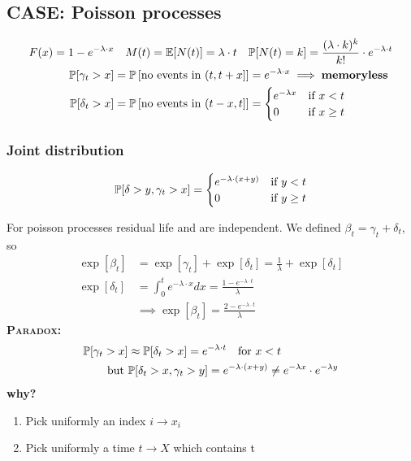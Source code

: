 \subsection{CASE: Poisson processes}
\begin{equation}
  \begin{split}
    F(x)=1-e^{-\lambda \cdot x} &\quad M(t)=\mathbb{E}[N(t)]=\lambda \cdot t \quad \mathbb{P}[N(t)=k]=\frac{(\lambda \cdot k)^k}{k!}\cdot e^{-\lambda \cdot t}\\
    \mathbb{P}[\gamma_t > x]&=\mathbb{P}\left[\text{no events in } (t,t+x] \right]=e^{-\lambda \cdot x} \implies \text{\textbf{memoryless}}\\
    \mathbb{P}[\delta_t > x] &= \mathbb{P} \left[\text{no events in }(t-x,t] \right]=
    \begin{cases}
      e^{-\lambda x} & \text{if } x < t \\
      0 & \text{if } x \ge t\\
    \end{cases}
  \end{split}
\end{equation}

\subsubsection{Joint distribution}
\begin{equation}
  \mathbb{P}[\delta > y , \gamma_t > x] =
  \begin{cases}
    e^{-\lambda \cdot (x+y)} & \text{if } y < t \\
    0     & \text{if } y \ge t \\
  \end{cases}
\end{equation}

For poisson processes residual life and are independent. We defined $\beta_t=\gamma_t + \delta_t$, so
\begin{equation}\begin{split}
\exp[\beta_t]&=\exp[\gamma_t] + \exp[\delta_t]  = \frac{1}{\lambda} + \exp[\delta_t]\\
\exp[\delta_t]&= \int_0^t e^{-\lambda \cdot x} dx = \frac{1-e^{-\lambda \cdot t}}{\lambda} \\
&\implies \exp[\beta_t]= \frac{2-e^{-\lambda \cdot t}}{\lambda}
\end{split}\end{equation}
\textbf{\textsc{Paradox:}}
\begin{equation}
  \begin{split}
    \mathbb{P}[\gamma_t > x] &\approx \mathbb{P}[\delta_t>x] = e^{-\lambda \cdot t} \quad \text{for }x<t \\
    \text{but } &\mathbb{P}[\delta_t >x , \gamma _ t > y ] = e^{-\lambda \cdot (x+y)} \neq e^{-\lambda x} \cdot e^{-\lambda y}
  \end{split}
\end{equation}
\textbf{why?}
\begin{enumerate}
  \item Pick uniformly an index $i \to x_i $
  \item Pick uniformly a time $t \to X$ which contains t
\end{enumerate}

